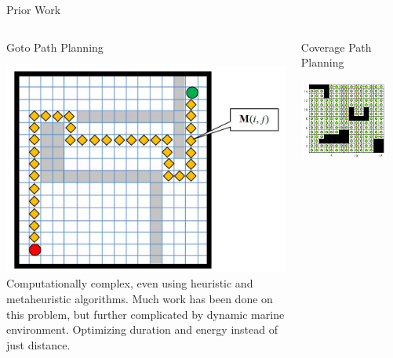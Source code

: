 \documentclass[9pt]{beamer}
\begin{document}
\begin{frame}{Prior Work}
    \begin{columns}
        \begin{column}{0.45\textwidth}
            \begin{block}{Goto Path Planning}
                \begin{center}
                    \includegraphics[width=\textwidth,trim={1cm 2cm 5cm 2cm},clip]{img/pathplanning.jpg}
                    \linebreak
                    Computationally complex, even using heuristic and metaheuristic algorithms. 
                    Much work has been done on this problem, but further complicated by dynamic marine environment.
                    Optimizing duration and energy instead of just distance. 
                \end{center}
            \end{block}
        \end{column}
        \begin{column}{0.45\textwidth}
            \begin{block}{Coverage Path Planning}
                \begin{center}
                    \includegraphics[width=0.85\textwidth,trim={1cm 2cm 2cm 1cm},clip]{img/coverageplanning.png}

\end{center}
\end{block}
\end{column}
\end{columns}
\end{frame}
\end{document}
